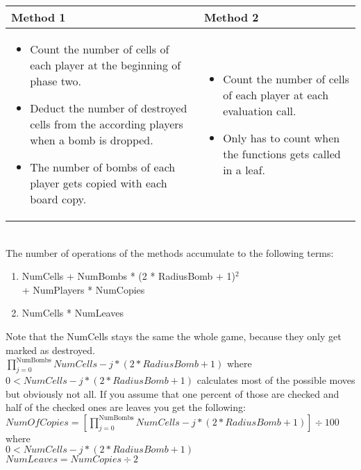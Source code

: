 \begin{tabular}{p{7cm}|p{7cm}}
	\textbf{Method 1} & \textbf{Method 2} \\ \hline
	\begin{itemize}
		\item Count the number of cells of each player at the beginning of phase two.
		\item Deduct the number of destroyed cells from the according players when a bomb is dropped.
		\item The number of bombs of each player gets copied with each board copy.
	\end{itemize}
	&
	\begin{itemize}
		\item Count the number of cells of each player at each evaluation call.
		\item Only has to count when the functions gets called in a leaf.
	\end{itemize}
\end{tabular} 
\mbox{ }\\
The number of operations of the methods accumulate to the following terms:
\begin{enumerate}
	\item NumCells + NumBombs * (2 * RadiusBomb + 1)$^2$ \\ + NumPlayers * NumCopies
	\item NumCells * NumLeaves
\end{enumerate}
Note that the NumCells stays the same the whole game, because they only get marked as destroyed. \\
$\prod\limits_{j = 0}^{\text{NumBombs}} NumCells - j * (2 * RadiusBomb + 1)$ where \\ $0 < NumCells - j * (2 * RadiusBomb + 1)$ calculates most of the possible moves but obviously not all. If you assume that one percent of those are checked and half of the checked ones are leaves you get the following: \\
$NumOfCopies = [\prod\limits_{j = 0}^{\text{NumBombs}} NumCells - j * (2 * RadiusBomb + 1)] \div 100$ where \\ $0 < NumCells - j * (2 * RadiusBomb + 1)$\\

 $NumLeaves = NumCopies \div 2$ \\
 
